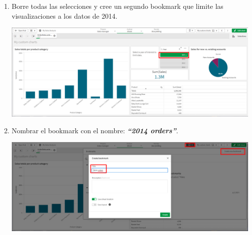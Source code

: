 \documentclass[12pt,letterpaper]{article}
\newcommand\tab[1][1cm]{\hspace*{#1}}
\begin{document}
\begin{enumerate}[\tab 1.]
        \item Borre todas las selecciones y cree un segundo bookmark que limite las visualizaciones a los datos de 2014.
        \begin{center}
            \includegraphics[width=13cm]{./img/img41.png}
        \end{center}
        \item Nombrar el bookmark con el nombre: \textit{\textbf{“2014 orders”}}.
        \begin{center}
            \includegraphics[width=13cm]{./img/img42.png}
        \end{center}
    \end{enumerate}
    
\end{document}
